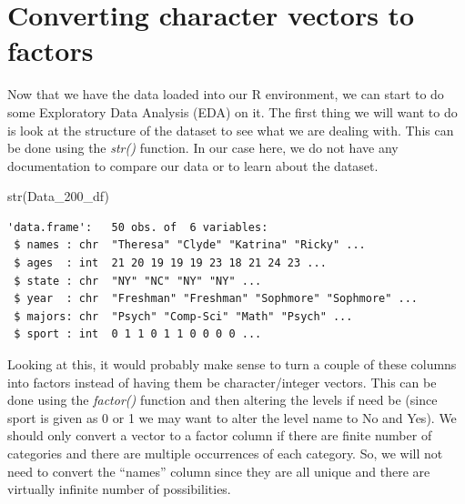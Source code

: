 \documentclass[
  letterpaper,
  DIV=11,
  numbers=noendperiod]{scrreprt}
\newenvironment{Shaded}{\begin{snugshade}}{\end{snugshade}}
\newcommand{\FunctionTok}[1]{\textcolor[rgb]{0.28,0.35,0.67}{#1}}
\newcommand{\NormalTok}[1]{\textcolor[rgb]{0.00,0.23,0.31}{#1}}
\newcommand{\OtherTok}[1]{\textcolor[rgb]{0.00,0.23,0.31}{#1}}
\newcommand{\SpecialCharTok}[1]{\textcolor[rgb]{0.37,0.37,0.37}{#1}}
\newcommand{\StringTok}[1]{\textcolor[rgb]{0.13,0.47,0.30}{#1}}
\begin{document}
\section{Converting character vectors to
factors}\label{converting-character-vectors-to-factors}

Now that we have the data loaded into our R environment, we can start to
do some Exploratory Data Analysis (EDA) on it. The first thing we will
want to do is look at the structure of the dataset to see what we are
dealing with. This can be done using the \emph{str()} function. In our
case here, we do not have any documentation to compare our data or to
learn about the dataset.

\begin{Shaded}
\begin{Highlighting}[]
\FunctionTok{str}\NormalTok{(Data\_200\_df)}
\end{Highlighting}
\end{Shaded}

\begin{verbatim}
'data.frame':   50 obs. of  6 variables:
 $ names : chr  "Theresa" "Clyde" "Katrina" "Ricky" ...
 $ ages  : int  21 20 19 19 19 23 18 21 24 23 ...
 $ state : chr  "NY" "NC" "NY" "NY" ...
 $ year  : chr  "Freshman" "Freshman" "Sophmore" "Sophmore" ...
 $ majors: chr  "Psych" "Comp-Sci" "Math" "Psych" ...
 $ sport : int  0 1 1 0 1 1 0 0 0 0 ...
\end{verbatim}

Looking at this, it would probably make sense to turn a couple of these
columns into factors instead of having them be character/integer
vectors. This can be done using the \emph{factor()} function and then
altering the levels if need be (since sport is given as 0 or 1 we may
want to alter the level name to No and Yes). We should only convert a
vector to a factor column if there are finite number of categories and
there are multiple occurrences of each category. So, we will not need to
convert the ``names'' column since they are all unique and there are
virtually infinite number of possibilities.

\begin{Shaded}
\end{Shaded}
\end{document}
